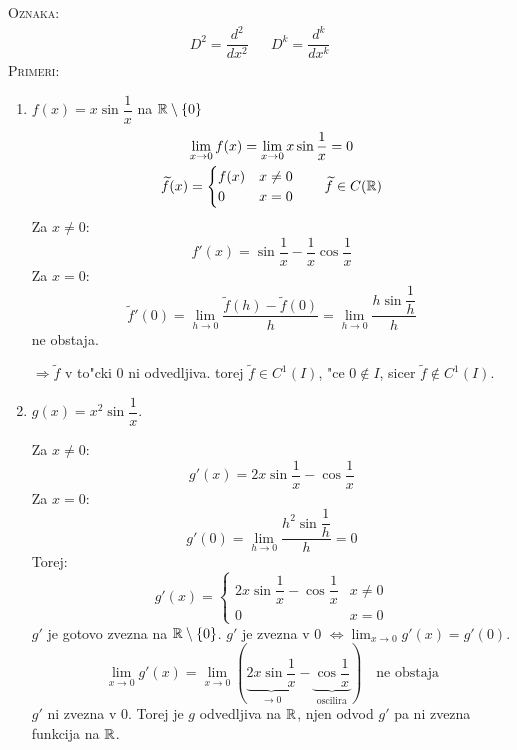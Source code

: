 \textsc{Oznaka:}
\begin{align*}
D^2 = \dfrac{d^2}{dx^2} && D^k = \dfrac{d^k}{dx^k}
\end{align*}
%
\textsc{Primeri:}
\begin{enumerate}
\item $f(x) = x \sin \dfrac{1}{x}$ na $\mathbb{R} \setminus \{0\}$
\begin{gather*}
\lim_{x \to 0} f(x) = \lim_{x \to 0} x \sin \dfrac{1}{x} = 0 \\
%
\widetilde{f}(x) = \begin{cases}
f(x) & x \neq 0 \\
0 & x = 0
\end{cases} \qquad \widetilde{f} \in C(\RR)
\end{gather*}
Za $x \neq 0$:
\begin{equation*}
f'(x) = \sin \dfrac{1}{x} - \dfrac{1}{x} \cos \dfrac{1}{x}
\end{equation*}
Za $x = 0$:
\begin{equation*}
\widetilde{f}'(0) = \lim_{h \to 0} \dfrac{\widetilde{f}(h) - \widetilde{f}(0)}{h} = \lim_{h \to 0} \dfrac{h \sin \dfrac{1}{h}}{h}
\end{equation*}
ne obstaja.

$\Rightarrow \widetilde{f}$ v to"cki 0 ni odvedljiva. torej $\widetilde{f} \in C^1(I)$, "ce $0 \notin I$, sicer $\widetilde{f} \notin C^1(I)$.

\item $g(x) = x^2 \sin\dfrac{1}{x}$.

Za $x \neq 0$:
\begin{equation*}
g'(x) = 2x \sin \dfrac{1}{x} - \cos \dfrac{1}{x}
\end{equation*}
Za $x = 0$:
\begin{equation*}
g'(0) = \lim_{h \to 0} \dfrac{h^2 \sin \dfrac{1}{h}}{h} = 0
\end{equation*}
Torej:
\begin{equation*}
g'(x) = \begin{cases}
2x \sin \dfrac{1}{x} - \cos \dfrac{1}{x} & x \neq 0 \\
0 & x = 0
\end{cases}
\end{equation*}
$g'$ je gotovo zvezna na $\mathbb{R} \setminus \{0\}$. $g'$ je zvezna v 0 $\iff \lim_{x \to 0} g'(x) = g'(0)$.
\begin{equation*}
\lim_{x \to 0} g'(x) = \lim_{x \to 0} (\underbrace{2x \sin \dfrac{1}{x}}_{\to 0} - \underbrace{\cos \dfrac{1}{x}}_{\text{oscilira}}) \quad \text{ne obstaja}
\end{equation*}
$g'$ ni zvezna v 0. Torej je $g$ odvedljiva na $\mathbb{R}$, njen odvod $g'$ pa ni zvezna funkcija na $\mathbb{R}$.
\end{enumerate}
%
